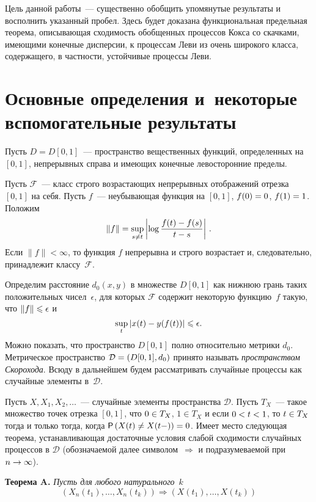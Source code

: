 \begin{multicols}{2}
Цель данной работы~--- существенно обобщить упомянутые результаты и
восполнить указанный пробел. Здесь будет доказана функциональная
предельная теорема, описывающая сходимость обобщенных процессов
Кокса со скачками, имеющими конечные дисперсии, к процессам Леви из
очень широкого класса, содержащего, в частности, устойчивые процессы
Леви.

\section{Основные определения и~некоторые вспомогательные результаты}

Пусть $D=D[0,1]$~--- пространство вещественных функций, определенных
на $[0,1]$, непрерывных справа и имеющих конечные левосторонние
пре\-делы.

Пусть $\mathcal{F}$~--- класс строго возрастающих непрерывных
отображений отрезка $[0,1]$ на себя. Пусть $f$~--- неубывающая
функция на $[0,1]$,   $f(0)\hm=0$, $f(1)\hm=1$. Положим
$$
\|f\|=\sup\limits_{s\neq t}\left|\log\displaystyle\frac{\displaystyle f(t)-f(s)\mathstrut}{\displaystyle t-s\mathstrut}\right|\,.
$$
Если $\|f\|<\infty$, то функция $f$ непрерывна и строго возрастает
и, следовательно, принадлежит классу~$\mathcal{F}$.

Определим расстояние $d_0(x,y)$ в множестве $D[0,1]$ как нижнюю
грань таких положительных чисел~$\epsilon$, для которых
$\mathcal{F}$ содержит некоторую функцию~$f$ такую, что
$\|f\|\hm\leqslant\epsilon$ и
$$
\sup\limits_t|x(t)\hm-y(f(t))|\hm\leqslant\epsilon.
$$
Можно показать, что пространство $D[0,1]$ полно относительно метрики
$d_0$. Метрическое пространство $\mathcal{D}\hm=(D[0,1],d_0)$ принято
называть {\it пространством Скорохода}. Всюду в дальнейшем будем
рассматривать случайные процессы как случайные элементы в~$\mathcal{D}$.

Пусть $X, X_1,X_2,\ldots$~--- случайные элементы пространства
$\mathcal{D}$. Пусть $T_X$~--- такое множество точек отрезка $[0,1]$,
что $0\hm\in T_X$, $1\in T_X$ и если $0\hm<t\hm<1$, то $t\hm\in T_X$ тогда и
только тогда, когда ${\sf P}\left(X(t)\neq X(t-)\right)\hm=0$. Имеет
место следующая тео\-ре\-ма, устанавливающая достаточные условия слабой
сходимости случайных процессов в $\mathcal{D}$ (обозначаемой далее
символом~$\Longrightarrow$ и подразумеваемой при $n\hm\to\infty$).

\smallskip

\noindent
\textbf{Теорема A.} \textit{Пусть для любого натурального}~$k$
$$
\left(X_n(t_1),\ldots ,X_n(t_k)\right)\Longrightarrow
\left(X(t_1),\ldots ,X(t_k)\right)
$$


\end{multicols}
